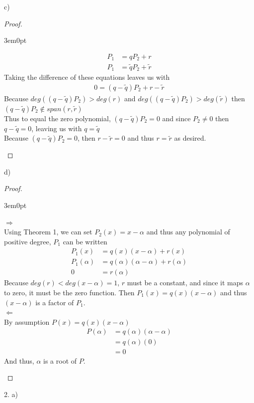 \documentclass[11pt]{article}
\newcommand{\bproof}{\begin{proof}
$ $ \\
\begin{adjustwidth}{3em}{0pt}
}
\newcommand{\eproof}{\end{adjustwidth}
\end{proof}}
\begin{document}
\begin{flushleft}
c) \bigskip

\bproof
	\begin{align*}
	P_1 &= qP_2 + r \\
	P_1 &= \tilde{q}P_2 + \tilde{r}
	\end{align*}
	Taking the difference of these equations leaves us with
	\begin{align*}
	0 = (q - \tilde{q})P_2 +r - \tilde{r}
	\end{align*}
	Because $deg((q - \tilde{q})P_2) > deg(r)$ and $deg((q - \tilde{q})P_2) > deg( \tilde{r})$ then $(q - \tilde{q})P_2 \notin span(r, \tilde{r})$ \\
	Thus to equal the zero polynomial, $(q - \tilde{q})P_2 = 0$ and since $P_2 \neq 0$ then $q - \tilde{q} = 0$, leaving us with $q = \tilde{q}$ \\
	Because $(q - \tilde{q})P_2 = 0$, then $r - \tilde{r} = 0$ and thus $r = \tilde{r}$ as desired.
\eproof

\newpage

d) \bigskip

\bproof
	$\Rightarrow$ \\
	Using Theorem 1, we can set $P_2(x) = x - \alpha$ and thus any polynomial of positive degree, $P_1$ can be written
	\begin{align*}
	P_1(x) &= q(x)(x - \alpha) + r(x) \\
	P_1(\alpha) &= q(\alpha)(\alpha - \alpha) + r(\alpha) \\
	0 &= r(\alpha)
	\end{align*}
	Because $deg(r) < deg(x- \alpha) = 1$, $r$ must be a constant, and since it maps $\alpha$ to zero, it must be the zero function. Then $P_1(x) = q(x)(x - \alpha)$ and thus $(x - \alpha)$ is a factor of $P_1$. \\ \bigskip
	$\Leftarrow$ \\
	By assumption $P(x) = q(x)(x - \alpha)$
	\begin{align*}
	P(\alpha) &= q(\alpha)(\alpha - \alpha) \\
	&= q(\alpha)(0) \\
	&= 0 
	\end{align*}
	And thus, $\alpha$ is a root of $P$.
	
\eproof

\newpage

2. a) \bigskip \\
\begin{figure}[h]
\centering

	\begin{subfigure}[b]{0.3\textwidth}
	\centering
	

\end{subfigure}
\end{figure}
\end{flushleft}
\end{document}
